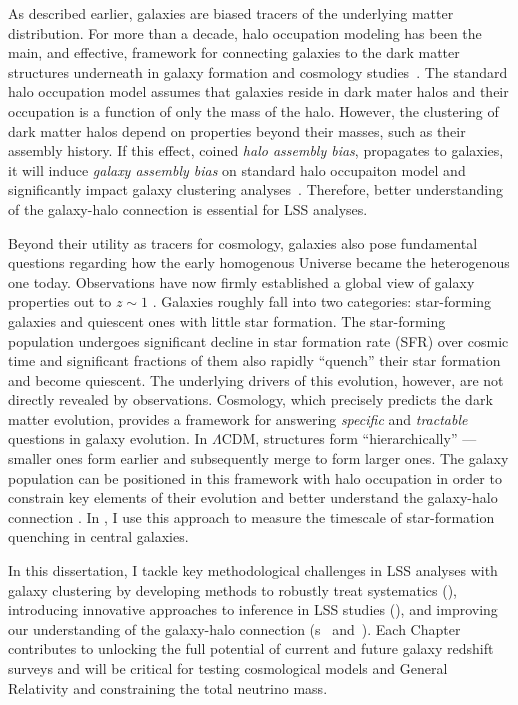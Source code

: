 As described earlier, galaxies are biased tracers of the 
underlying matter distribution. For more than a decade, halo occupation 
modeling has been the main, and effective, framework for connecting galaxies
to the dark matter structures underneath in galaxy formation and cosmology
studies~\citep{Yang:2003aa, Tinker:2005aa, vandenBosch:2007aa, Zheng:2007aa, 
Conroy:2009aa, Guo:2011aa, Leauthaud:2012aa, Tinker:2013aa, Zu:2015aa}.
The standard halo occupation model
assumes that galaxies reside in dark mater halos and their occupation 
is a function of only the mass of the halo. However, the clustering of dark 
matter halos depend on properties beyond their masses, such as their 
assembly history. If this effect, coined 
{\em halo assembly bias}, propagates to galaxies, it will induce 
{\em galaxy assembly bias} on standard halo occupaiton model and 
significantly impact galaxy clustering 
analyses~\citep[][]{hearin15, Zentner:2016aa, Vakili:2016aa}. 
Therefore, better understanding of the galaxy-halo connection is 
essential for LSS analyses. 

Beyond their utility as tracers for cosmology, galaxies also pose fundamental 
questions regarding how the early homogenous Universe became the heterogenous 
one today. Observations have now firmly established a global view of galaxy 
properties out to $z\sim1$ \citep[\emph{e.g.}][]{Blanton:2009aa, Moustakas:2013aa}.
Galaxies roughly fall into two categories: star-forming galaxies and 
quiescent ones with little star formation. The star-forming population 
undergoes significant decline in star formation rate (SFR) over cosmic 
time and significant fractions of them also rapidly ``quench'' their 
star formation and become quiescent. The underlying drivers of this 
evolution, however, are not directly revealed by observations.
Cosmology, which precisely predicts the dark matter evolution, provides 
a framework for answering {\em specific} and {\em tractable} questions 
in galaxy evolution.  In $\Lambda$CDM, structures form 
``hierarchically'' --- smaller ones form earlier and subsequently 
merge to form larger ones. The galaxy population can be positioned in 
this framework with halo occupation in order to constrain key elements 
of their evolution and better understand the galaxy-halo connection 
\citep[][]{Wetzel:2013aa, Wetzel:2014aa, Tinker:2016ab, Tinker:2017aa}. 
In , I use this approach to measure the timescale of star-formation quenching 
in central galaxies. 

In this dissertation, I tackle key methodological challenges in LSS analyses
with galaxy clustering by developing methods to robustly treat systematics (), 
introducing innovative approaches to inference in LSS studies (), and 
improving our understanding of the galaxy-halo connection 
(\chapname s~ and~). Each Chapter contributes to unlocking 
the full potential of current and future galaxy redshift surveys and will be
critical for testing cosmological models and General Relativity and 
constraining the total neutrino mass. 

